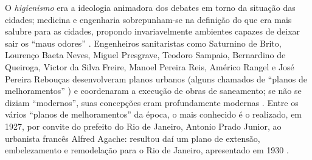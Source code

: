 O \textit{higienismo} era a ideologia animadora dos debates em torno da situação das cidades; medicina e engenharia sobrepunham-se na definição do que era mais salubre para as cidades, propondo invariavelmente ambientes capazes de deixar sair os ``maus odores'' \cite{CAPONI2002}. Engenheiros sanitaristas como Saturnino de Brito, Lourenço Baeta Neves, Miguel Presgrave, Teodoro Sampaio, Bernardino de Queiroga, Victor da Silva Freire, Manoel Pereira Reis, Américo Rangel e José Pereira Rebouças desenvolveram planos urbanos (alguns chamados de ``planos de melhoramentos'' \cite{leme_urbasp_1991}) e coordenaram a execução de obras de saneamento; se não se diziam ``modernos'', suas concepções eram profundamente modernas \cite{andrade_saturnino_1991}. Entre os vários ``planos de melhoramentos'' da época, o mais conhecido é o realizado, em 1927, por convite do prefeito do Rio de Janeiro, Antonio Prado Junior, ao urbanista francês Alfred Agache: resultou daí um plano de extensão, embelezamento e remodelação para o Rio de Janeiro, apresentado em 1930 \cite{pinheiro_capiconsul_2009}.